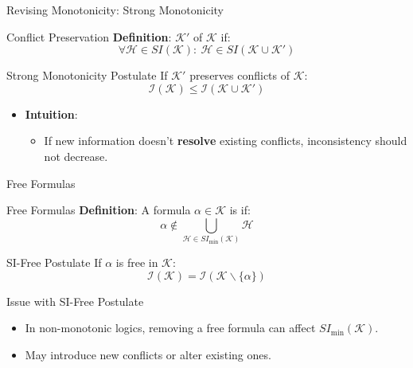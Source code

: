 \begin{frame}{Revising Monotonicity: Strong Monotonicity}
    \begin{block}{Conflict Preservation}
        \textbf{Definition}: \( \mathcal{K}' \)  of \( \mathcal{K} \) if:
        \[
            \forall \mathcal{H} \in SI(\mathcal{K}):\ \mathcal{H} \in SI(\mathcal{K} \cup \mathcal{K}')
        \]
    \end{block}
    \begin{block}{Strong Monotonicity Postulate}
        If \( \mathcal{K}' \) preserves conflicts of \( \mathcal{K} \):
        \[
            \mathcal{I}(\mathcal{K}) \leq \mathcal{I}(\mathcal{K} \cup \mathcal{K}')
        \]
    \end{block}
    \begin{itemize}
        \item \textbf{Intuition}:
              \begin{itemize}
                  \item If new information doesn't \textbf{resolve} existing conflicts, inconsistency should not decrease.
              \end{itemize}
    \end{itemize}
\end{frame}

\begin{frame}{Free Formulas}
    \begin{block}{Free Formulas}
        \textbf{Definition}: A formula \( \alpha \in \mathcal{K} \) is  if:
        \[
            \alpha \notin \bigcup\limits_{\mathcal{H} \in SI_{\min}(\mathcal{K})} \mathcal{H}
        \]
    \end{block}
    \begin{block}{SI-Free Postulate}
        If \( \alpha \) is free in \( \mathcal{K} \):
        \[
            \mathcal{I}(\mathcal{K}) = \mathcal{I}(\mathcal{K} \backslash \{\alpha\})
        \]
    \end{block}
    \begin{alertblock}{Issue with SI-Free Postulate}
        \begin{itemize}
            \item In non-monotonic logics, removing a free formula can affect \( SI_{\min}(\mathcal{K}) \).
            \item May introduce new conflicts or alter existing ones.
        \end{itemize}
    \end{alertblock}
\end{frame}

